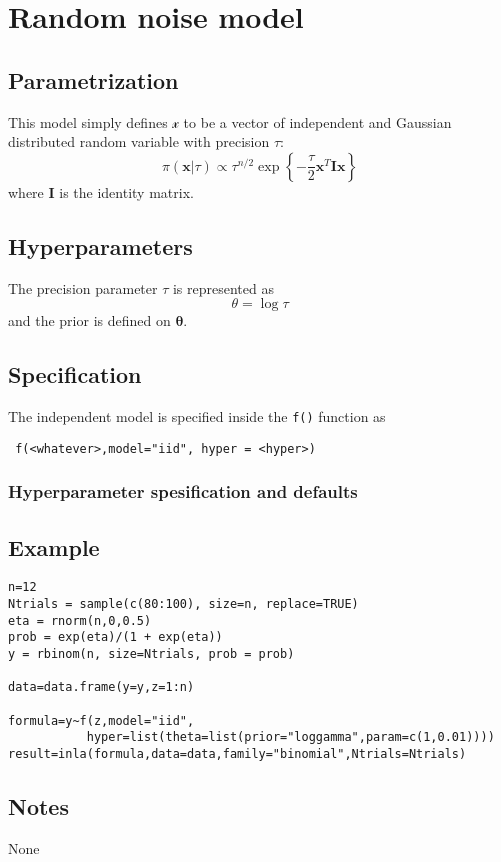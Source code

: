 \documentclass[a4paper,11pt]{article}
\begin{document}
\section*{Random noise model}

\subsection*{Parametrization}

This model simply defines $\mathcal{x}$ to be a vector of independent
and Gaussian distributed random variable with precision $\tau$:
\[
\pi(\mathbf{x}|\tau) \propto \tau^{n/2}\exp\left\{
  -\frac{\tau}{2}\mathbf{x}^T\mathbf{I}\mathbf{x} \right\}
\]
where $\mathbf{I}$ is the identity matrix.
\subsection*{Hyperparameters}

The precision parameter $\tau$ is represented as
\begin{displaymath}
    \theta =\log \tau
\end{displaymath}
and the prior is defined on $\mathbf{\theta}$.

\subsection*{Specification}

The independent model is specified inside the {\tt f()} function as
\begin{verbatim}
 f(<whatever>,model="iid", hyper = <hyper>)
\end{verbatim}

\subsubsection*{Hyperparameter spesification and defaults}


\subsection*{Example}

\begin{verbatim}
n=12
Ntrials = sample(c(80:100), size=n, replace=TRUE)
eta = rnorm(n,0,0.5)
prob = exp(eta)/(1 + exp(eta))
y = rbinom(n, size=Ntrials, prob = prob)

data=data.frame(y=y,z=1:n)

formula=y~f(z,model="iid",
           hyper=list(theta=list(prior="loggamma",param=c(1,0.01))))
result=inla(formula,data=data,family="binomial",Ntrials=Ntrials)
\end{verbatim}


\subsection*{Notes}

None
\end{document}
